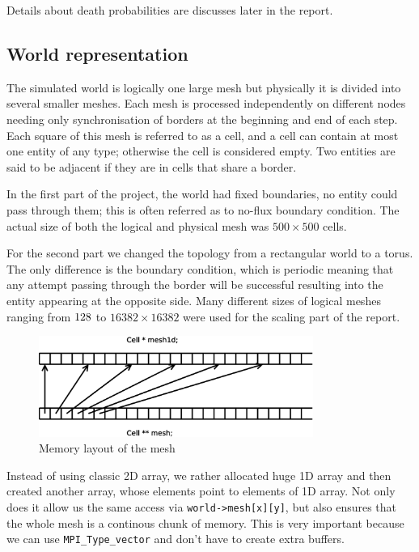 \documentclass[a4paper]{article}
\begin{document}
Details about death probabilities are discusses later in the report.

\subsection{World representation}

The simulated world is logically one large mesh but physically it is divided into several smaller meshes.
Each mesh is processed independently on different nodes needing only synchronisation of borders at the beginning and end of each step.
Each square of this mesh is referred to as a cell, and a cell can contain at most one entity of any type; otherwise the cell is considered empty.
Two entities are said to be adjacent if they are in cells that share a border.

In the first part of the project, the world had fixed boundaries, no entity could pass through them; this is often referred as to no-flux boundary condition.
The actual size of both the logical and physical mesh was $500 \times 500$ cells.

For the second part we changed the topology from a rectangular world to a torus.
The only difference is the boundary condition, which is periodic meaning that any attempt passing through the border will be successful resulting into the entity appearing at the opposite side.
Many different sizes of logical meshes ranging from $128 \time 128$ to $16382 \times 16382$ were used for the scaling part of the report.

\begin{figure}[ht]
    \centering
    \includegraphics[width=0.8\textwidth]{mesh}
    \caption{Memory layout of the mesh}
\end{figure}

Instead of using classic 2D array, we rather allocated huge 1D array and then created another array, whose elements point to elements of 1D array.
Not only does it allow us the same access via \verb|world->mesh[x][y]|, but also ensures that the whole mesh is a continous chunk of memory.
This is very important because we can use \verb|MPI_Type_vector| and don't have to create extra buffers.
\end{document}
